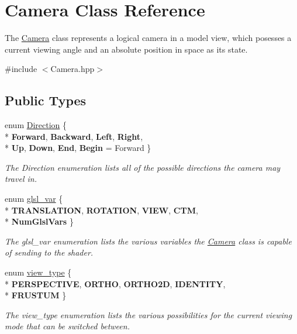 \hypertarget{class_camera}{\section{Camera Class Reference}
\label{class_camera}
}


The \hyperlink{class_camera}{Camera} class represents a logical camera in a model view, which posesses a current viewing angle and an absolute position in space as its state.  




{\ttfamily \#include $<$Camera.\-hpp$>$}

\subsection*{Public Types}
\begin{DoxyCompactItemize}
\item 
enum \hyperlink{class_camera_a80cb65605322d27ad3b6d973484509ec}{Direction} \{ \\*
{\bfseries Forward}, 
{\bfseries Backward}, 
{\bfseries Left}, 
{\bfseries Right}, 
\\*
{\bfseries Up}, 
{\bfseries Down}, 
{\bfseries End}, 
{\bfseries Begin} =  Forward
 \}
\begin{DoxyCompactList}\small\item\em The Direction enumeration lists all of the possible directions the camera may travel in. \end{DoxyCompactList}\item 
enum \hyperlink{class_camera_a6ff726a75a430e4f17e5dec42e4d4405}{glsl\-\_\-var} \{ \\*
{\bfseries T\-R\-A\-N\-S\-L\-A\-T\-I\-O\-N}, 
{\bfseries R\-O\-T\-A\-T\-I\-O\-N}, 
{\bfseries V\-I\-E\-W}, 
{\bfseries C\-T\-M}, 
\\*
{\bfseries Num\-Glsl\-Vars}
 \}
\begin{DoxyCompactList}\small\item\em The glsl\-\_\-var enumeration lists the various variables the \hyperlink{class_camera}{Camera} class is capable of sending to the shader. \end{DoxyCompactList}\item 
enum \hyperlink{class_camera_afdccec6d447490dcc80ab6b99f21d0e5}{view\-\_\-type} \{ \\*
{\bfseries P\-E\-R\-S\-P\-E\-C\-T\-I\-V\-E}, 
{\bfseries O\-R\-T\-H\-O}, 
{\bfseries O\-R\-T\-H\-O2\-D}, 
{\bfseries I\-D\-E\-N\-T\-I\-T\-Y}, 
\\*
{\bfseries F\-R\-U\-S\-T\-U\-M}
 \}
\begin{DoxyCompactList}\small\item\em The view\-\_\-type enumeration lists the various possibilities for the current viewing mode that can be switched between. \end{DoxyCompactList}\end{DoxyCompactItemize}
